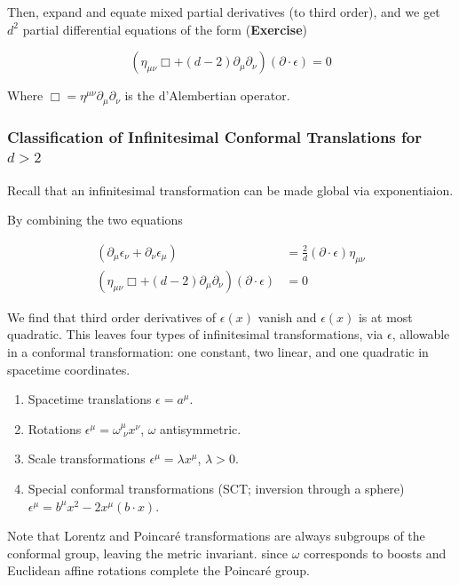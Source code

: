 \documentclass[10pt]{article}
\begin{document}
\noindent Then, expand and equate mixed partial derivatives (to third order), and we get $d^2$ partial differential equations of the form (\textbf{Exercise})

\begin{equation}
(\eta_{\mu\nu} \Box + (d-2) \partial_\mu \partial_\nu) (\partial \cdot \epsilon) = 0
\end{equation}

\noindent Where $\Box = \eta^{\mu\nu} \partial_\mu \partial_\nu$ is the d'Alembertian operator.

\subsubsection*{Classification of Infinitesimal Conformal Translations for $d>2$}

\noindent Recall that an infinitesimal transformation can be made global via exponentiaion.

\noindent By combining the two equations

\begin{align}
(\partial_\mu \epsilon_\nu + \partial_\nu \epsilon_\mu) &= \frac{2}{d} (\partial \cdot \epsilon) \eta_{\mu\nu} \\
(\eta_{\mu\nu} \Box + (d-2) \partial_\mu \partial_\nu) (\partial \cdot \epsilon) &= 0
\end{align}

\noindent We find that third order derivatives of $\epsilon(x)$ vanish and $\epsilon(x)$ is at most quadratic. This leaves four types of infinitesimal transformations, via $\epsilon$, allowable in a conformal transformation: one constant, two linear, and one quadratic in spacetime coordinates.

\begin{enumerate}
\item Spacetime translations
	\subitem $\epsilon = a^\mu$.
\item Rotations
	\subitem  $\epsilon^\mu = \omega^\mu_{\,\,\nu} x^\nu$, $\omega$ antisymmetric.
\item Scale transformations
	\subitem $\epsilon^\mu = \lambda x^\mu$, $\lambda > 0$.
\item Special conformal transformations (SCT; inversion through a sphere)
	\subitem $\epsilon^\mu = b^\mu x^2 - 2 x^\mu (b \cdot x)$.
\end{enumerate}

\noindent Note that Lorentz and Poincar\'e transformations are always subgroups of the conformal group, leaving the metric invariant. since $\omega$ corresponds to boosts and Euclidean affine rotations complete the Poincar\'e group. \\
\end{document}
